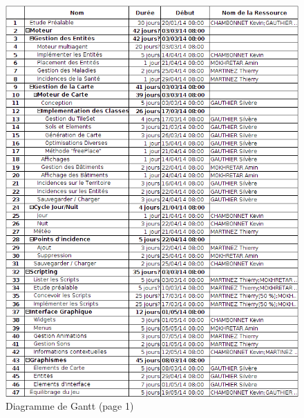 \documentclass[a4paper]{memoir}
\begin{document}
		\section*{}
			\begin{figure}[H]
				\begin{center}
					\includegraphics[scale=0.5]{img/gantt_1.png}
				\end{center}
				\label{fig:gantt1}
				\caption{Diagramme de Gantt (page 1)}
			\end{figure}
\end{document}
